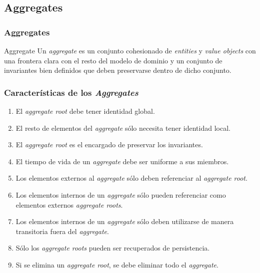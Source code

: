 \documentclass[a4paper,slidestop,xcolor=pst,dvips,blue]{beamer}
\begin{document}
\subsection{Aggregates}

\begin{frame}[c]
    \frametitle{Aggregates}
    \begin{block}{Aggregate}
        Un \emph{aggregate} es un conjunto cohesionado de \emph{entities} y \emph{value objects} con una frontera clara con el resto del modelo de dominio y un conjunto de invariantes bien definidos que deben preservarse dentro de dicho conjunto.
    \end{block}
\end{frame}

\begin{frame}[c]
    \frametitle{Características de los \emph{Aggregates}}
    \begin{enumerate}[<+->]
        \item El \emph{aggregate root} debe tener identidad global.
        \item El resto de elementos del \emph{aggregate} sólo necesita tener identidad local.
        \item El \emph{aggregate root} es el encargado de preservar los invariantes.
        \item El tiempo de vida de un \emph{aggregate} debe ser uniforme a sus miembros.
        \item Los elementos externos al \emph{aggregate} sólo deben referenciar al \emph{aggregate root}.
        \item Los elementos internos de un \emph{aggregate} sólo pueden referenciar como elementos externos \emph{aggregate roots}.
        \item Los elementos internos de un \emph{aggregate} sólo deben utilizarse de manera transitoria fuera del \emph{aggregate}.
        \item Sólo los \emph{aggregate roots} pueden ser recuperados de persistencia.
        \item Si se elimina un \emph{aggregate root}, se debe eliminar todo el \emph{aggregate}.
    \end{enumerate}
\end{frame}
\end{document}
